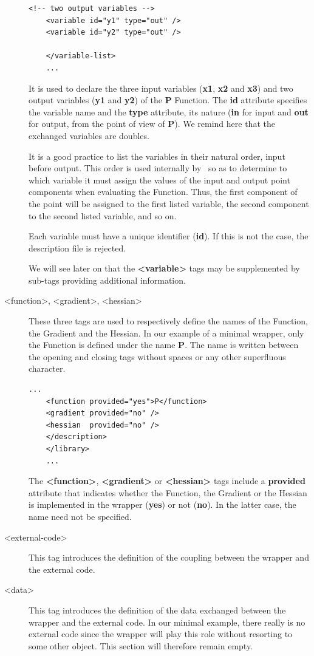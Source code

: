 \begin{description}
\begin{lstlisting}[frame=TBRL]
    <!-- two output variables -->
    <variable id="y1" type="out" />
    <variable id="y2" type="out" />

    </variable-list>
    ...
  \end{lstlisting}

  It is used to declare the three input variables ({\bf x1}, {\bf x2} and {\bf x3}) and two output variables ({\bf y1} and {\bf y2}) of the {\bf P} Function. The {\bf id} attribute specifies the variable name and the {\bf type} attribute, its nature ({\bf in} for input and {\bf out} for output, from the point of view of {\bf P}). We remind here that the exchanged variables are doubles.

  It is a good practice to list the variables in their natural order, input before output. This order is used internally by \OT\ so as to determine to which variable it must assign the values of the input and output point components when evaluating the Function. Thus, the first component of the point will be assigned to the first listed variable, the second component to the second listed variable, and so on.

  Each variable must have a unique identifier ({\bf id}). If this is not the case, the description file is rejected.

  We will see later on that the {\bf <variable>} tags may be supplemented by sub-tags providing additional information.

\item[<function>, <gradient>, <hessian>] These three tags are used to respectively define the names of the Function, the Gradient and the Hessian. In our example of a minimal wrapper, only the Function is defined under the name {\bf P}. The name is written between the opening and closing tags without spaces or any other superfluous character.

  \lstset{language=XML, basicstyle=\normalsize}
  \begin{lstlisting}[frame=TBRL]
    ...
    <function provided="yes">P</function>
    <gradient provided="no" />
    <hessian  provided="no" />
    </description>
    </library>
    ...
  \end{lstlisting}

  The {\bf <function>}, {\bf <gradient>} or {\bf <hessian>} tags include a {\bf provided} attribute that indicates whether the Function, the Gradient or the Hessian is implemented in the wrapper ({\bf yes}) or not ({\bf no}). In the latter case, the name need not be specified.

\item[<external-code>] This tag introduces the definition of the coupling between the wrapper and the external code.

\item[<data>] This tag introduces the definition of the data exchanged between the wrapper and the external code. In our minimal example, there really is no external code since the wrapper will play this role without resorting to some other object. This section will therefore remain empty.
\end{description}

